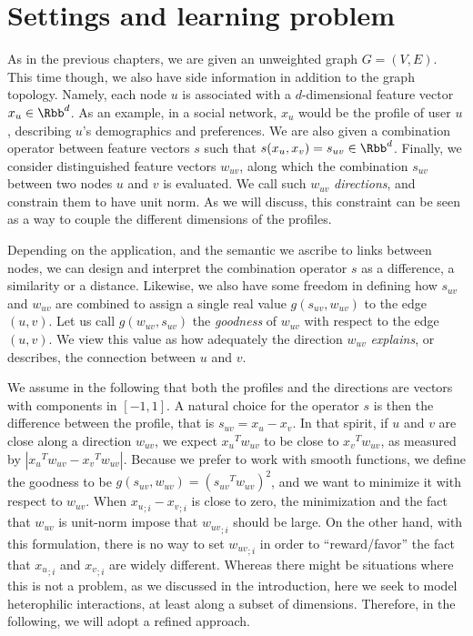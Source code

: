 \section{Settings and learning problem}
\label{sec:edge_model}

As in the previous chapters, we are given an unweighted graph $G=(V,E)$. This
time though, we also have side information in addition to the graph topology. Namely, each node $u$
is associated with a $d$-dimensional feature vector $x_u \in \Rbb^d$. As an example, in a social
network, $x_u$ would be the profile of user $u$, describing $u$'s demographics and preferences. We
are also given a combination operator between feature vectors $s$ such that $s(x_u, x_v) = s_{uv}
\in \Rbb^d$. Finally, we consider distinguished feature vectors $w_{uv}$,
along which the combination $s_{uv}$ between two nodes $u$ and $v$ is evaluated. We call such
$w_{uv}$ \emph{directions}, and constrain them to have unit norm. As we will discuss, this
constraint can be seen as a way to couple the different dimensions of the profiles.

Depending on the application, and the semantic we ascribe to links between nodes, we can design and
interpret the combination operator $s$ as a difference, a similarity or a distance. Likewise, we
also have some freedom in defining how $s_{uv}$ and $w_{uv}$ are combined to assign a single real
value $g(s_{uv}, w_{uv})$ to the edge $(u,v)$. Let us call $g(w_{uv}, s_{uv})$ the \emph{goodness}
of $w_{uv}$ with respect to the edge $(u,v)$. We view this value as how adequately the direction
$w_{uv}$ \emph{explains}, or describes, the connection between $u$ and $v$.

\medskip

We assume in the following that both the profiles and the directions are vectors with components in
$[-1, 1]$. A natural choice for the operator $s$ is then the difference between the profile, that is
$s_{uv} = x_u - x_v$. In that spirit, if $u$ and $v$ are close along a direction $w_{uv}$, we expect
${x_u}^T w_{uv}$ to be close to ${x_v}^T w_{uv}$, as measured by $|{x_u}^T w_{uv} - {x_v}^T
w_{uv}|$. Because we prefer to work with smooth functions, we define the goodness to be $g(s_{uv},
w_{uv}) = \left({s_{uv}}^T w_{uv} \right)^2$, and we want to minimize it with respect to $w_{uv}$.
When ${x_u}_{;i} - {x_v}_{;i}$ is close to zero, the minimization and the fact that $w_{uv}$ is
unit-norm impose that ${w_{uv}}_{;i}$ should be large. On the other hand, with this formulation,
there is no way to set ${w_{uv}}_{;i}$ in order to \enquote{reward/favor} the fact that
${x_u}_{;i}$ and ${x_v}_{;i}$ are widely different.
Whereas there might be situations where this is not a problem, as we discussed in the introduction,
here we seek to model heterophilic interactions, at least along a subset of dimensions. Therefore, in
the following, we will adopt a refined approach.

